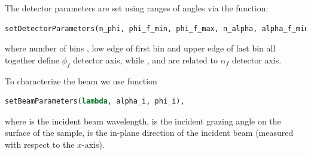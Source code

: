 The detector parameters are set using ranges of angles via
the function:

\begin{lstlisting}[language=python, style=eclipse,numbers=none]
setDetectorParameters(n_phi, phi_f_min, phi_f_max, n_alpha, alpha_f_min, alpha_f_max),
\end{lstlisting}


\noindent where number of bins , low edge of first bin  and
upper edge of last bin  all together define $\phi_f$ detector axis, 
while ,  and  are related to 
$\alpha_f$ detector axis.

\vspace*{2mm}



\noindent To characterize the beam we use function 
\begin{lstlisting}[language=python, style=eclipse,numbers=none]
setBeamParameters(lambda, alpha_i, phi_i),
\end{lstlisting}

\noindent where  is the incident beam wavelength,
 is the incident
grazing angle on the surface of the sample,
 is the in-plane
direction of the incident beam (measured with respect to the $x$-axis).


